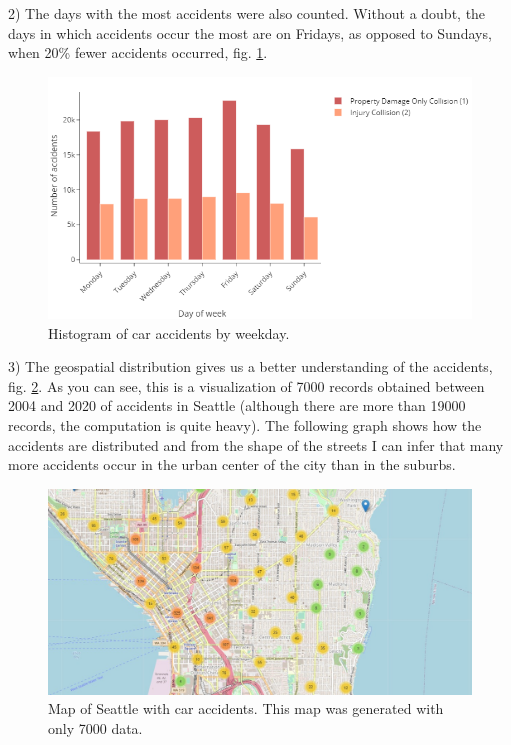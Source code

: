 \documentclass[12pt]{article}
\begin{document}
  2) The days with the most accidents were also counted. Without a doubt, the days in which accidents occur the most are on Fridays, as opposed to Sundays, when 20\% fewer accidents occurred, fig. \ref{fig:dayofweek}. \\
\begin{figure}[htbp]
    \centering
      \includegraphics[width=1\textwidth]{../images/day_of_week.png}
    \caption{Histogram of car accidents by weekday.}
    \label{fig:dayofweek}
  \end{figure}
  
  3) The geospatial distribution gives us a better understanding of the accidents, fig. \ref{fig:map}. As you can see, this is a visualization of 7000 records obtained between 2004 and 2020 of accidents in Seattle (although there are more than 19000 records, the computation is quite heavy). The following graph shows how the accidents are distributed and from the shape of the streets I can infer that many more accidents occur in the urban center of the city than in the suburbs. \\

  \begin{figure}[htbp]
    \centering
      \includegraphics[width=1\textwidth]{../images/map_d.jpeg}
    \caption{Map of Seattle with car accidents. This map was generated with only 7000 data. }
    \label{fig:map}
  \end{figure}
\end{document}
